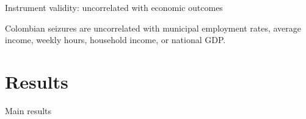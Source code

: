 \documentclass[aspectratio=169]{beamer}
\begin{document}
\begin{frame}{Instrument validity: uncorrelated with economic outcomes}

\begin{center}
\scalebox{0.72}{%
\begin{threeparttable}

\end{threeparttable}
}
\end{center}
\vspace{0.3em}
{\footnotesize Colombian seizures are uncorrelated with municipal employment rates, average income, weekly hours, household income, or national GDP.}

\end{frame}


\section{Results}

\begin{frame}{Main results}

\begin{center}
\scalebox{0.62}{%
\begin{threeparttable}

\end{threeparttable}
}
\end{center}

\end{frame}
\end{document}
